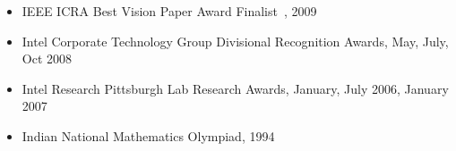 \begin{itemize}
\item IEEE ICRA Best Vision Paper Award Finalist~\cite{collet2009object}, 2009
\item Intel Corporate Technology Group Divisional Recognition Awards, May, July, Oct 2008
\item Intel Research Pittsburgh Lab Research Awards, January, July 2006, January 2007
\item Indian National Mathematics Olympiad, 1994
\end{itemize}
